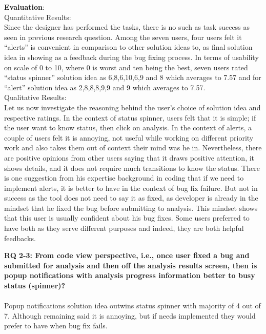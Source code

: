 \textbf{Evaluation}: \\

Quantitative Results: \\

Since the designer has performed the tasks, there is no such as task success as seen in previous research question. Among the seven users, four users felt it “alerts” is convenient in comparison to other solution ideas to, as final solution idea in showing as a feedback during the bug fixing process. In terms of usability on scale of 0 to 10, where 0 is worst and ten being the best, seven users rated “status spinner” solution idea as 6,8,6,10,6,9 and 8 which averages to 7.57 and for “alert” solution idea as 2,8,8,8,9,9 and 9 which averages to 7.57. \\

Qualitative Results: \\

Let us now investigate the reasoning behind the user’s choice of solution idea and respective ratings. In the context of status spinner, users felt that it is simple; if the user want to know status, then click on analysis. In the context of alerts, a couple of users felt it is annoying, not useful while working on different priority work and also takes them out of context their mind was he in. Nevertheless, there are positive opinions from other users saying that it draws positive attention, it shows details, and it does not require much transitions to know the status. There is one suggestion from his expertise background in coding that if we need to implement alerts, it is better to have in the context of bug fix failure. But not in success as the tool does not need to say it as fixed, as developer is already in the mindset that he fixed the bug before submitting to analysis. This mindset shows that this user is usually confident about his bug fixes. Some users preferred to have both as they serve different purposes and indeed, they are both helpful feedbacks. \\

\begin{myboxi}{{\textbf{RQ 2-3: From code view perspective, i.e., once user fixed a bug and submitted for analysis and then off the analysis results screen, then is popup notifications with analysis progress information better to busy status (spinner)?}}}
\\ \\	Popup notifications solution idea outwins status spinner with majority of 4 out of 7. Although remaining said it is annoying, but if needs implemented they would prefer to have when bug fix fails.
\end{myboxi}

